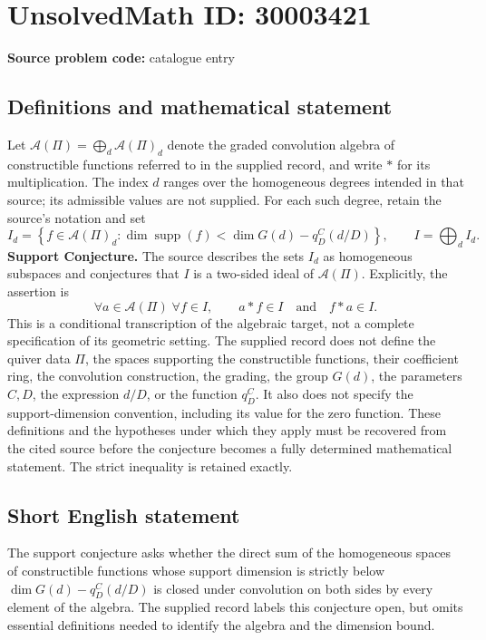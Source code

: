 \documentclass[11pt]{article}
\begin{document}
\section*{UnsolvedMath ID: 30003421}
\textbf{Source problem code:} catalogue entry
\subsection{Definitions and mathematical statement}
Let \(\mathcal A(\Pi)=\bigoplus_d\mathcal A(\Pi)_d\) denote the graded convolution algebra of constructible functions referred to in the supplied record, and write \(*\) for its multiplication. The index \(d\) ranges over the homogeneous degrees intended in that source; its admissible values are not supplied. For each such degree, retain the source's notation and set
\[
I_d=\left\{f\in\mathcal A(\Pi)_d:\dim\operatorname{supp}(f)<\dim G(d)-q_D^C(d/D)\right\},
\qquad I=\bigoplus_d I_d.
\]
\textbf{Support Conjecture.} The source describes the sets \(I_d\) as homogeneous subspaces and conjectures that \(I\) is a two-sided ideal of \(\mathcal A(\Pi)\). Explicitly, the assertion is
\[
\forall a\in\mathcal A(\Pi)\;\forall f\in I,\qquad a*f\in I\quad\text{and}\quad f*a\in I.
\]
This is a conditional transcription of the algebraic target, not a complete specification of its geometric setting. The supplied record does not define the quiver data \(\Pi\), the spaces supporting the constructible functions, their coefficient ring, the convolution construction, the grading, the group \(G(d)\), the parameters \(C,D\), the expression \(d/D\), or the function \(q_D^C\). It also does not specify the support-dimension convention, including its value for the zero function. These definitions and the hypotheses under which they apply must be recovered from the cited source before the conjecture becomes a fully determined mathematical statement. The strict inequality is retained exactly.
\subsection{Short English statement}
The support conjecture asks whether the direct sum of the homogeneous spaces of constructible functions whose support dimension is strictly below \(\dim G(d)-q_D^C(d/D)\) is closed under convolution on both sides by every element of the algebra. The supplied record labels this conjecture open, but omits essential definitions needed to identify the algebra and the dimension bound.
\end{document}
